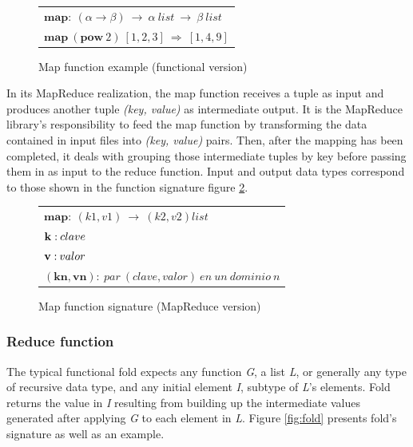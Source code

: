 \begin{figure}[tbp]
\begin{center}
\begin{tabular}{|l|}
\hline
$\mathbf{map:} \: \left ( \alpha \rightarrow \beta \right ) \: \rightarrow \: \alpha \: list \: \rightarrow \: \beta \: list$ \\
$\mathbf{map} \: \left( \mathbf{pow}\:2 \right) \: \left[ 1,2,3 \right] \: \Rightarrow \: \left[ 1,4,9 \right ]$ \\
\hline
\end{tabular}
\caption{Map function example (functional version)}
\label{fig:functionalmap}
\end{center}
\end{figure}

In its MapReduce realization, the map function receives a tuple as input and produces another tuple \emph{(key, value)} as intermediate output. It is the MapReduce library's responsibility to feed the map function by transforming the data contained in input files into \emph{(key, value)} pairs. Then, after the mapping has been completed, it deals with grouping those intermediate tuples by key before passing them in as input to the reduce function. Input and output data types correspond to those shown in the function signature figure \ref{fig:mapreducemap}.

\begin{figure}[tbp]
\begin{center}
\begin{tabular}{|l|}
\hline
$\mathbf{map:} \: \left( k1,v1 \right) \: \rightarrow \: \left( k2,v2 \right) list$ \\
$\mathbf{k:} \: clave \linebreak$ \\
$\mathbf{v:} \: valor \linebreak$ \\
$\mathbf{\left(kn,vn \right):} \: par \: \left( clave,valor \right) \: en \: un \: dominio \: n$ \\
\hline
\end{tabular}
\caption{Map function signature (MapReduce version)}
\label{fig:mapreducemap}
\end{center}
\end{figure}


\subsubsection{Reduce function}\label{reduce}
\noindent The typical functional fold expects any function \emph{G}, a list \emph{L}, or generally any type of recursive data type, and any initial element \emph{I}, subtype of \emph{L}'s elements. Fold returns the value in \emph{I} resulting from building up the intermediate values generated after applying \emph{G} to each element in \emph{L}. Figure \ref{fig:fold} presents fold's signature as well as an example.

